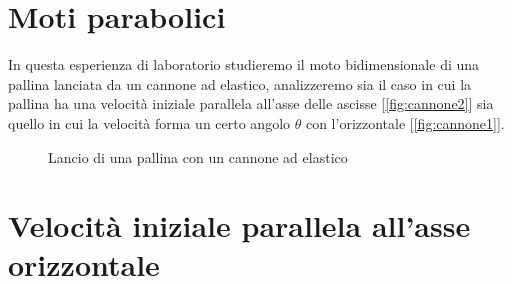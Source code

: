 \documentclass[a4paper,10pt,oneside]{article}
\begin{document}
\thispagestyle{empty}
 \section*{Moti parabolici}
\vspace{1cm}

In questa esperienza di laboratorio studieremo il moto bidimensionale di una pallina lanciata da un cannone ad elastico, analizzeremo sia il caso in cui la pallina ha una velocità iniziale parallela all'asse delle ascisse [\ref{fig:cannone2}] sia quello in cui la velocità forma un certo angolo $\theta$ con l'orizzontale [\ref{fig:cannone1}].
\begin{figure}[H]
\caption{Lancio di una pallina con un cannone ad elastico}
\label{fig:sistema}
\end{figure}


\section*{Velocità iniziale parallela all'asse orizzontale}
\end{document}
